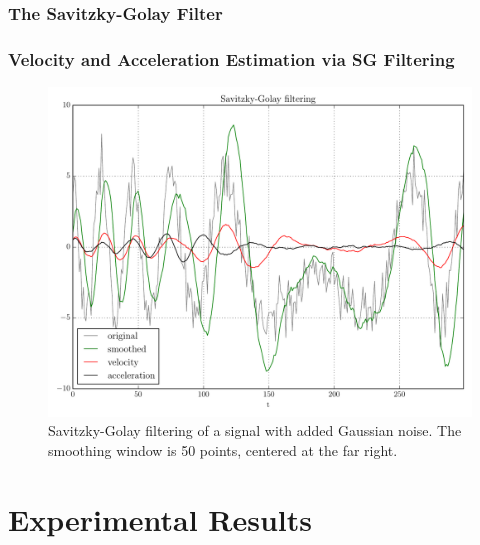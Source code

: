 \documentclass[hyperref={pdfpagelabels=false}]{beamer}
\begin{document}
%
\subsubsection*{The Savitzky-Golay Filter}
\begin{frame} \frametitle{Velocity and Acceleration Estimation via SG Filtering}
\begin{figure}
\centering\includegraphics[scale=0.30]{../img/savgol.pdf}
\caption{Savitzky-Golay filtering of a signal with added Gaussian noise. The smoothing window is 50 points, centered at the far right.} 
\label{fig:savgol}
\end{figure}
\end{frame}

%
\section{Experimental Results}
\begin{frame}
  \tableofcontents[currentsection]
\end{frame}
\end{document}
